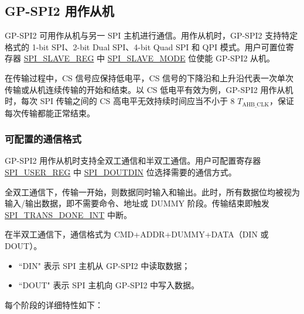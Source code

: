 \documentclass[main\_\_CN.tex]{subfiles}
\begin{document}
\subsection{GP-SPI2 用作从机}\label{sec:gp-spi2-slave-mode}

GP-SPI2 可用作从机与另一 SPI 主机进行通信。用作从机时，GP-SPI2 支持特定格式的 1-bit SPI、2-bit Dual SPI、4-bit Quad SPI 和 QPI 模式。用户可置位寄存器 \hyperref[regdesc:SPISLAVEREG]{SPI\_SLAVE\_REG} 中 \hyperref[fielddesc:SPISLAVEMODE]{SPI\_SLAVE\_MODE} 位使能 GP-SPI2 从机。 

在传输过程中，CS 信号应保持低电平，CS 信号的下降沿和上升沿代表一次单次传输或从机连续传输的开始和结束。以 CS 低电平有效为例，GP-SPI2 用作从机时，每次 SPI 传输之间的 CS 高电平无效持续时间应当不小于 8 $T_{\textrm{AHB\_CLK}}$，保证每次传输都能正常结束。

\subsubsection{可配置的通信格式}\label{sec:slave-communication-format}

GP-SPI2 用作从机时支持全双工通信和半双工通信。用户可配置寄存器 \hyperref[regdesc:SPIUSERREG]{SPI\_USER\_REG} 中 \hyperref[fielddesc:SPIDOUTDIN]{SPI\_DOUTDIN} 位选择需要的通信方式。

全双工通信下，传输一开始，则数据同时输入和输出。此时，所有数据位均被视为输入/输出数据，即不需要命令、地址或 DUMMY 阶段。传输结束即触发 \hyperref[int:SPITRANSDONEINT]{SPI\_TRANS\_DONE\_INT} 中断。  

在半双工通信下，通信格式为 CMD+ADDR+DUMMY+DATA（DIN 或 DOUT）。
\begin{itemize}
    \item ``DIN" 表示 SPI 主机从 GP-SPI2 中读取数据；
    \item ``DOUT" 表示 SPI 主机向 GP-SPI2 中写入数据。
\end{itemize}

每个阶段的详细特性如下：
\end{document}
